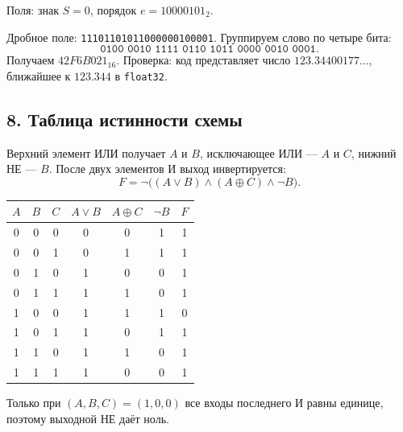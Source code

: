 Поля: знак $S=0$, порядок $e=10000101_2$.
\par\noindent Дробное поле: \texttt{11101101011000000100001}. Группируем слово по четыре бита:
\[
\texttt{0100 0010 1111 0110 1011 0000 0010 0001}.
\]
Получаем $\boxed{42F6B021_{16}}$. Проверка: код представляет число $123.34400177\ldots$, ближайшее к $123.344$ в \texttt{float32}.

\subsection*{8. Таблица истинности схемы}
Верхний элемент ИЛИ получает $A$ и $B$, исключающее ИЛИ --- $A$ и $C$, нижний НЕ --- $B$. После двух элементов И выход инвертируется:
\[
F=\lnot\bigl((A\lor B)\land(A\oplus C)\land\lnot B\bigr).
\]
\begin{center}
\begin{tabular}{ccc|ccc|c}
$A$&$B$&$C$&$A\lor B$&$A\oplus C$&$\lnot B$&$F$\\\hline
0&0&0&0&0&1&1\\
0&0&1&0&1&1&1\\
0&1&0&1&0&0&1\\
0&1&1&1&1&0&1\\
1&0&0&1&1&1&0\\
1&0&1&1&0&1&1\\
1&1&0&1&1&0&1\\
1&1&1&1&0&0&1
\end{tabular}
\end{center}
Только при $(A,B,C)=(1,0,0)$ все входы последнего И равны единице, поэтому выходной НЕ даёт ноль.
